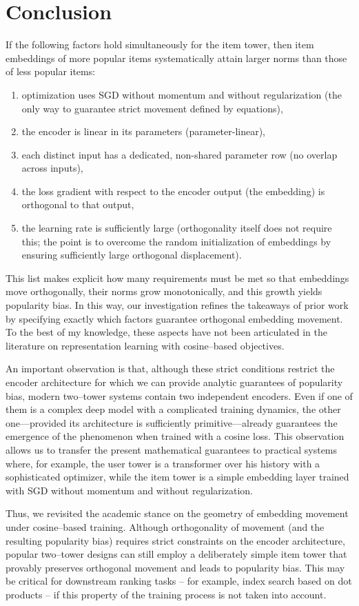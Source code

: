 \section{Conclusion}

If the following factors hold simultaneously for the item tower, then item embeddings of more popular items systematically attain larger norms than those of less popular items:
\begin{enumerate}
  \item optimization uses SGD without momentum and without regularization (the only way to guarantee strict movement defined by equations), 
  \item the encoder is linear in its parameters (parameter-linear),
  \item each distinct input has a dedicated, non-shared parameter row (no overlap across inputs),
  \item the loss gradient with respect to the encoder output (the embedding) is orthogonal to that output,
  \item the learning rate is sufficiently large (orthogonality itself does not require this; the point is to overcome the random initialization of embeddings by ensuring sufficiently large orthogonal displacement).
\end{enumerate}

This list makes explicit how many requirements must be met so that embeddings move orthogonally, their norms grow monotonically, and this growth yields popularity bias. In this way, our investigation refines the takeaways of prior work by specifying exactly which factors guarantee orthogonal embedding movement. To the best of my knowledge, these aspects have not been articulated in the literature on representation learning with cosine–based objectives.

An important observation is that, although these strict conditions restrict the encoder architecture for which we can provide analytic guarantees of popularity bias, modern two–tower systems contain two independent encoders. Even if one of them is a complex deep model with a complicated training dynamics, the other one—provided its architecture is sufficiently primitive—already guarantees the emergence of the phenomenon when trained with a cosine loss. This observation allows us to transfer the present mathematical guarantees to practical systems where, for example, the user tower is a transformer over his history with a sophisticated optimizer, while the item tower is a simple embedding layer trained with SGD without momentum and without regularization.

Thus, we revisited the academic stance on the geometry of embedding movement under cosine–based training. Although orthogonality of movement (and the resulting popularity bias) requires strict constraints on the encoder architecture, popular two–tower designs can still employ a deliberately simple item tower that provably preserves orthogonal movement and leads to popularity bias. 
This may be critical for downstream ranking tasks -- for example, index search based on dot products -- if this property of the training process is not taken into account.
